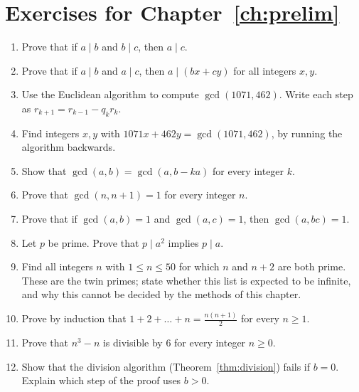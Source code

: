\section*{Exercises for Chapter~\ref{ch:prelim}}

\begin{enumerate}
  \item Prove that if $a\mid b$ and $b\mid c$, then $a\mid c$.
  \item Prove that if $a\mid b$ and $a\mid c$, then $a\mid (bx+cy)$ for all integers $x,y$.
  \item Use the Euclidean algorithm to compute $\gcd(1071,462)$. Write each step as $r_{k+1}=r_{k-1}-q_k r_k$.
  \item Find integers $x,y$ with $1071x+462y=\gcd(1071,462)$, by running the algorithm backwards.
  \item Show that $\gcd(a,b)=\gcd(a,b-ka)$ for every integer $k$.
  \item Prove that $\gcd(n,n+1)=1$ for every integer $n$.
  \item Prove that if $\gcd(a,b)=1$ and $\gcd(a,c)=1$, then $\gcd(a,bc)=1$.
  \item Let $p$ be prime. Prove that $p\mid a^2$ implies $p\mid a$.
  \item Find all integers $n$ with $1\le n\le 50$ for which $n$ and $n+2$ are both prime. These are the twin primes; state whether this list is expected to be infinite, and why this cannot be decided by the methods of this chapter.
  \item Prove by induction that $1+2+\dots+n=\frac{n(n+1)}{2}$ for every $n\ge 1$.
  \item Prove that $n^3-n$ is divisible by $6$ for every integer $n\ge 0$.
  \item Show that the division algorithm (Theorem~\ref{thm:division}) fails if $b=0$. Explain which step of the proof uses $b>0$.
\end{enumerate}

